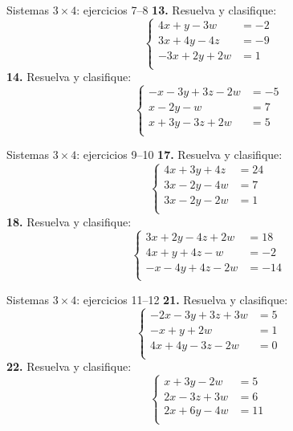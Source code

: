 \documentclass[aspectratio=169,9pt]{beamer}
\theoremstyle{remark}
\begin{document}
\begin{frame}{Sistemas $3\times 4$: ejercicios 7--8}
\small
\textbf{13.} Resuelva y clasifique:
\[\left\{\begin{aligned}
4x+y-3w&=-2\\
3x+4y-4z&=-9\\
-3x+2y+2w&=1\\
\end{aligned}\right.\]
\textbf{14.} Resuelva y clasifique:
\[\left\{\begin{aligned}
-x-3y+3z-2w&=-5\\
x-2y-w&=7\\
x+3y-3z+2w&=5\\
\end{aligned}\right.\]
\end{frame}
\begin{frame}{Sistemas $3\times 4$: ejercicios 9--10}
\small
\textbf{17.} Resuelva y clasifique:
\[\left\{\begin{aligned}
4x+3y+4z&=24\\
3x-2y-4w&=7\\
3x-2y-2w&=1\\
\end{aligned}\right.\]
\textbf{18.} Resuelva y clasifique:
\[\left\{\begin{aligned}
3x+2y-4z+2w&=18\\
4x+y+4z-w&=-2\\
-x-4y+4z-2w&=-14\\
\end{aligned}\right.\]
\end{frame}
\begin{frame}{Sistemas $3\times 4$: ejercicios 11--12}
\small
\textbf{21.} Resuelva y clasifique:
\[\left\{\begin{aligned}
-2x-3y+3z+3w&=5\\
-x+y+2w&=1\\
4x+4y-3z-2w&=0\\
\end{aligned}\right.\]
\textbf{22.} Resuelva y clasifique:
\[\left\{\begin{aligned}
x+3y-2w&=5\\
2x-3z+3w&=6\\
2x+6y-4w&=11\\
\end{aligned}\right.\]
\end{frame}
\end{document}
